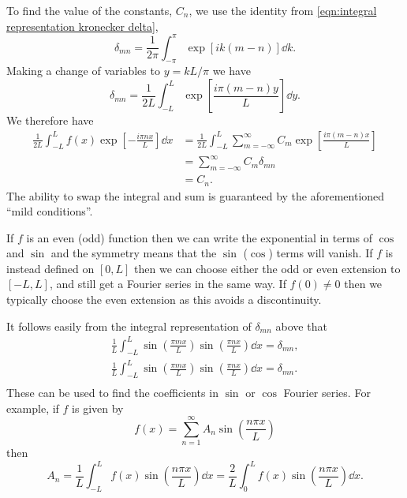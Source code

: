 \documentclass[fleqn]{NotesClass}
\begin{document}
    To find the value of the constants, \(C_n\), we use the identity from \cref{eqn:integral representation kronecker delta},
    \begin{equation}
        \delta_{mn} = \frac{1}{2\pi}\int_{-\pi}^{\pi} \exp[ik(m - n)] \dd{k}.
    \end{equation}
    Making a change of variables to \(y = kL/\pi\) we have
    \begin{equation}
        \delta_{mn} = \frac{1}{2L} \int_{-L}^{L} \exp\left[ \frac{i\pi(m - n)y}{L} \right] \dd{y}.
    \end{equation}
    We therefore have
    \begin{align}
        \frac{1}{2L} \int_{-L}^{L} f(x) \exp\left[ -\frac{i\pi nx}{L} \right] \dd{x} &= \frac{1}{2L}\int_{-L}^{L} \sum_{m=-\infty}^{\infty} C_m \exp\left[ \frac{i\pi(m - n)x}{L} \right]\\
        &= \sum_{m=-\infty}^{\infty} C_m\delta_{mn}\\
        &= C_n.
    \end{align}
    The ability to swap the integral and sum is guaranteed by the aforementioned \enquote{mild conditions}.
    
    If \(f\) is an even (odd) function then we can write the exponential in terms of \(\cos\) and \(\sin\) and the symmetry means that the \(\sin\) (\(\cos\)) terms will vanish.
    If \(f\) is instead defined on \([0, L]\) then we can choose either the odd or even extension to \([-L, L]\), and still get a Fourier series in the same way.
    If \(f(0) \ne 0\) then we typically choose the even extension as this avoids a discontinuity.
    
    It follows easily from the integral representation of \(\delta_{mn}\) above that
    \begin{align}
        \frac{1}{L}\int_{-L}^{L} \sin\left( \frac{\pi mx}{L} \right)\sin\left( \frac{\pi nx}{L} \right) \dd{x} = \delta_{mn},\\
        \frac{1}{L}\int_{-L}^{L} \sin\left( \frac{\pi mx}{L} \right)\sin\left( \frac{\pi nx}{L} \right) \dd{x} = \delta_{mn}.\\
    \end{align}
    These can be used to find the coefficients in \(\sin\) or \(\cos\) Fourier series.
    For example, if \(f\) is given by
    \begin{equation}
        f(x) = \sum_{n=1}^{\infty} A_n \sin\left( \frac{n\pi x}{L} \right)
    \end{equation}
    then
    \begin{equation}
        A_n = \frac{1}{L} \int_{-L}^{L} f(x) \sin\left( \frac{n\pi x}{L} \right) \dd{x} = \frac{2}{L} \int_0^L f(x) \sin\left( \frac{n \pi x}{L} \right) \dd{x}.
    \end{equation}
    
\end{document}

